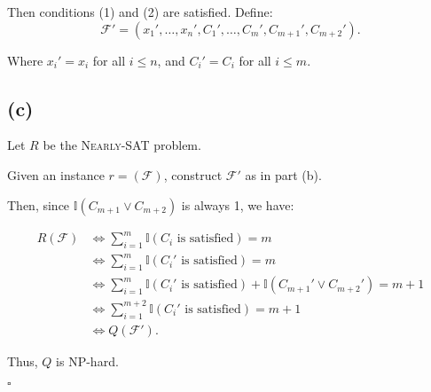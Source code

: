 Then conditions (1) and (2) are satisfied. Define:
\[
\mathcal{F}' = (x_1', \dots, x_{n}', C_1', \dots, C_m', C_{m+1}', C_{m+2}').
\]

Where $x_i' = x_i$ for all $i \leq n$, and $C_i' = C_i$ for all $i \leq m$.

\subsection*{(c)}
Let \( R \) be the \textsc{Nearly-SAT} problem.

Given an instance \( r = (\mathcal{F}) \), construct \( \mathcal{F}' \) as in part (b).

Then, since $\mathbb{I}(C_{m+1} \lor C_{m+2})$ is always 1, we have:

\begin{equation}
    \begin{split}
        R(\mathcal{F}) &\iff \sum_{i=1}^{m} \mathbb{I}(C_i \text{ is satisfied}) = m \\
        &\iff \sum_{i=1}^{m} \mathbb{I}(C_i' \text{ is satisfied}) = m \\
        &\iff \sum_{i=1}^{m} \mathbb{I}(C_i' \text{ is satisfied}) + \mathbb{I}(C_{m+1}' \lor C_{m+2}') = m + 1 \\
        &\iff \sum_{i=1}^{m+2} \mathbb{I}(C_i' \text{ is satisfied}) = m + 1 \\
        &\iff Q(\mathcal{F}').
    \end{split}
\end{equation}

Thus, \( Q \) is NP-hard.

\(\square\)

